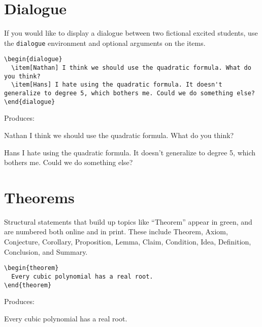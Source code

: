 \documentclass{ximera}
\begin{document}
\section{Dialogue} \label{Dialogue}

\begin{example} If you would like to display a dialogue between two fictional excited students, use the \verb!dialogue! environment and optional arguments on the items. 

\begin{verbatim}
\begin{dialogue}
  \item[Nathan] I think we should use the quadratic formula. What do you think?
  \item[Hans] I hate using the quadratic formula. It doesn't generalize to degree 5, which bothers me. Could we do something else?
\end{dialogue}
\end{verbatim}

Produces:

\begin{dialogue}
  \item[Nathan] I think we should use the quadratic formula. What do you think?
  \item[Hans] I hate using the quadratic formula. It doesn't generalize to degree 5, which bothers me. Could we do something else?
\end{dialogue}
\end{example}


\section{Theorems} \label{TheoremEnvironments}

\begin{example} Structural statements that build up topics like ``Theorem'' appear in green, and are numbered both online and in print. These include Theorem, Axiom, Conjecture, Corollary, Proposition, Lemma, Claim, Condition, Idea, Definition, Conclusion, and Summary.

\begin{verbatim}
\begin{theorem} 
  Every cubic polynomial has a real root. 
\end{theorem}
\end{verbatim}

Produces:

\begin{theorem} 
  Every cubic polynomial has a real root. 
\end{theorem}
\end{example}
\end{document}
